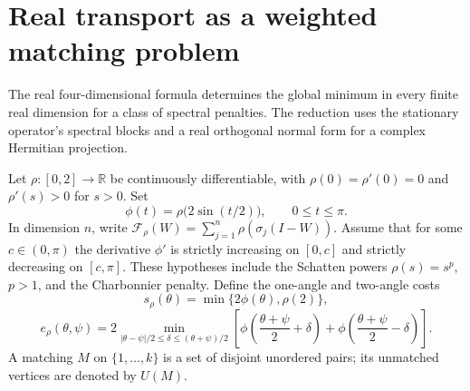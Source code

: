 \section{Real transport as a weighted matching problem}
\label{sec:real-matching-transport}

The real four-dimensional formula determines the global minimum in every
finite real dimension for a class of spectral penalties. The reduction
uses the stationary operator's spectral blocks and a real orthogonal
normal form for a complex Hermitian projection.

Let $\rho:[0,2]\to\mathbb R$ be continuously differentiable, with
$\rho(0)=\rho'(0)=0$ and $\rho'(s)>0$ for $s>0$. Set
\[
 \phi(t)=\rho\bigl(2\sin(t/2)\bigr),\qquad 0\leq t\leq\pi.
\]
In dimension $n$, write
$\mathcal F_\rho(W)=\sum_{j=1}^n\rho(\sigma_j(I-W))$.
Assume that for some $c\in(0,\pi)$ the derivative $\phi'$ is strictly
increasing on $[0,c]$ and strictly decreasing on $[c,\pi]$.
These hypotheses include the Schatten powers $\rho(s)=s^p$, $p>1$,
and the Charbonnier penalty. Define the one-angle and two-angle costs
\[
 s_\rho(\theta)=\min\{2\phi(\theta),\rho(2)\},
\]
\[
 e_\rho(\theta,\psi)=
   2\min_{|\theta-\psi|/2\leq\delta\leq(\theta+\psi)/2}
    \left[\phi\left(\frac{\theta+\psi}{2}+\delta\right)
          +\phi\left(\frac{\theta+\psi}{2}-\delta\right)\right].
\]
A matching $M$ on $\{1,\ldots,k\}$ is a set of disjoint unordered
pairs; its unmatched vertices are denoted by $U(M)$.

